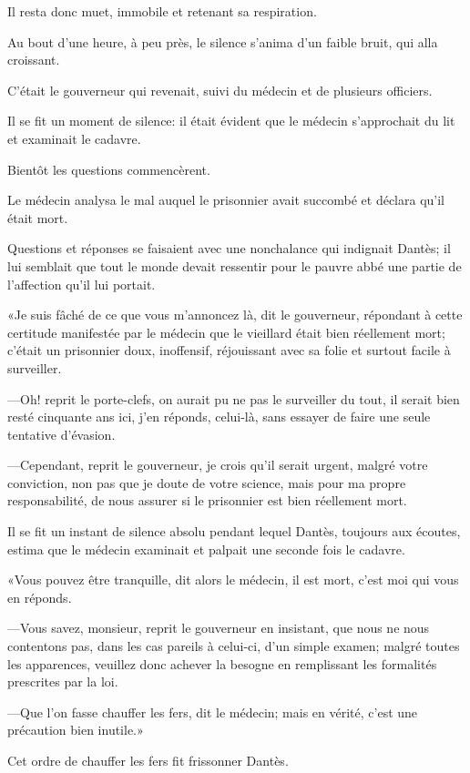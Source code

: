 Il resta donc muet, immobile et retenant sa respiration.

Au bout d'une heure, à peu près, le silence s'anima d'un faible bruit, qui alla croissant.

C'était le gouverneur qui revenait, suivi du médecin et de plusieurs officiers.

Il se fit un moment de silence: il était évident que le médecin s'approchait du lit et examinait le cadavre.

Bientôt les questions commencèrent.

Le médecin analysa le mal auquel le prisonnier avait succombé et déclara qu'il était mort.

Questions et réponses se faisaient avec une nonchalance qui indignait Dantès; il lui semblait que tout le monde devait ressentir pour le pauvre abbé une partie de l'affection qu'il lui portait.

«Je suis fâché de ce que vous m'annoncez là, dit le gouverneur, répondant à cette certitude manifestée par le médecin que le vieillard était bien réellement mort; c'était un prisonnier doux, inoffensif, réjouissant avec sa folie et surtout facile à surveiller.

—Oh! reprit le porte-clefs, on aurait pu ne pas le surveiller du tout, il serait bien resté cinquante ans ici, j'en réponds, celui-là, sans essayer de faire une seule tentative d'évasion.

—Cependant, reprit le gouverneur, je crois qu'il serait urgent, malgré votre conviction, non pas que je doute de votre science, mais pour ma propre responsabilité, de nous assurer si le prisonnier est bien réellement mort.

Il se fit un instant de silence absolu pendant lequel Dantès, toujours aux écoutes, estima que le médecin examinait et palpait une seconde fois le cadavre.

«Vous pouvez être tranquille, dit alors le médecin, il est mort, c'est moi qui vous en réponds.

—Vous savez, monsieur, reprit le gouverneur en insistant, que nous ne nous contentons pas, dans les cas pareils à celui-ci, d'un simple examen; malgré toutes les apparences, veuillez donc achever la besogne en remplissant les formalités prescrites par la loi.

—Que l'on fasse chauffer les fers, dit le médecin; mais en vérité, c'est une précaution bien inutile.»

Cet ordre de chauffer les fers fit frissonner Dantès.

